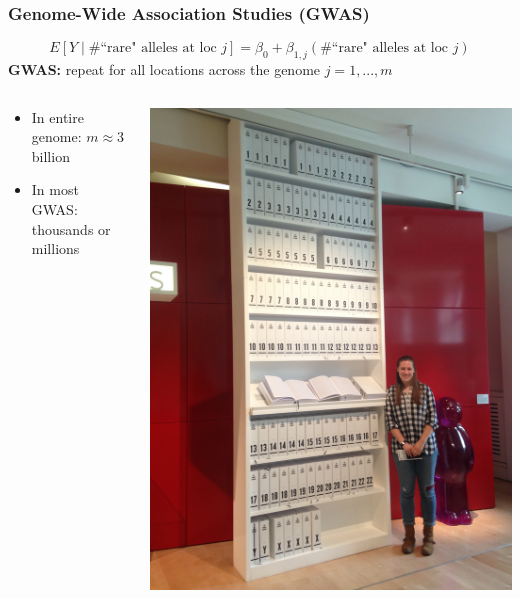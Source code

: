 \documentclass[12pt, 
hyperref={colorlinks=true, linkcolor=blue, urlcolor=cyan},dvipsnames]{beamer}
\begin{document}
\begin{frame}
\frametitle{Genome-Wide Association Studies (GWAS)}

$$E[Y \mid \# \text{``rare" alleles at loc } j] = \beta_0 + \beta_{1,j} \left(\# \text{``rare" alleles at loc } j\right)$$ \textbf{GWAS:} repeat for all locations across the genome $j = 1, ..., m$ \pause

\begin{columns}
\begin{column}{0.7\textwidth}
\begin{itemize}
\item In entire genome: $m \approx 3$ billion
\item In most GWAS: thousands or millions
\end{itemize}
\end{column}

\begin{column}{0.3\textwidth}
\vspace{0.3cm}
\includegraphics[angle=270,origin=c,width=\textwidth]{figs/bookcase}
\end{column}
\end{columns}

\end{frame}
\end{document}
